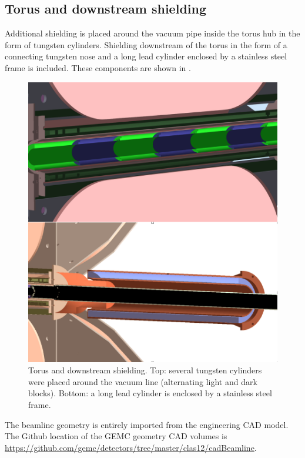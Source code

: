 \subsection{Torus and downstream shielding}
Additional shielding is placed around the vacuum pipe inside the torus hub in the form of tungsten cylinders.
Shielding downstream of the torus in the form of a connecting tungsten nose and a long lead cylinder enclosed
by a stainless steel frame is included. These components are shown in .

\begin{figure}
	\centering
	\includegraphics[width=0.98\columnwidth,keepaspectratio]{img/downstreamShielding.png}
	\caption{Torus and downstream shielding. Top: several tungsten cylinders were placed around the vacuum line
			 (alternating light and dark blocks).
             Bottom: a long lead cylinder is enclosed by a stainless steel frame.}
	\label{fig:downstreamShielding}
\end{figure}


The beamline geometry is entirely imported from the engineering CAD model.
The Github location of the GEMC geometry CAD volumes is \url{https://github.com/gemc/detectors/tree/master/clas12/cadBeamline}.
